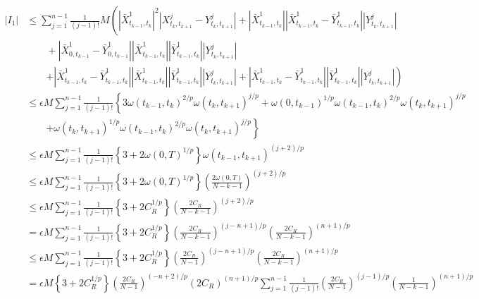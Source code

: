 \begin{prf}
\begin{description}
\begin{align}
					|I_1|
					&\leq \sum_{j=1}^{n-1} \frac{1}{(j-1)!}M \left( \left|\bar{X}^1_{t_{k-1},t_k}\right|^2\left|X^j_{t_k,t_{k+1}} - Y^j_{t_k,t_{k+1}}\right|
						+ \left|\bar{X}^1_{t_{k-1},t_k}\right| \left|\bar{X}^1_{t_{k-1},t_k}-\bar{Y}^1_{t_{k-1},t_k}\right| \left|Y^j_{t_k,t_{k+1}}\right| \right.\\
						&\qquad + \left|\bar{X}^1_{0,t_{k-1}}-\bar{Y}^1_{0,t_{k-1}}\right|\left|\bar{X}^1_{t_{k-1},t_k}\right|\left|\bar{Y}^1_{t_{k-1},t_k}\right|\left|Y^j_{t_k,t_{k+1}}\right| \\
						&\qquad \left. + \left|\bar{X}^1_{t_{k-1},t_k}-\bar{Y}^1_{t_{k-1},t_k}\right|\left|\bar{X}^1_{t_{k-1},t_k}\right|\left|\bar{Y}^1_{t_{k-1},t_k}\right|\left|Y^j_{t_k,t_{k+1}}\right|
						+ \left|\bar{X}^1_{t_{k-1},t_k}-\bar{Y}^1_{t_{k-1},t_k}\right|\left|\bar{Y}^1_{t_{k-1},t_k}\right|\left|Y^j_{t_k,t_{k+1}}\right| \right) \\
					&\leq \epsilon M \sum_{j=1}^{n-1} \frac{1}{(j-1)!} \left\{ 3 \omega(t_{k-1},t_k)^{2/p} \omega(t_k,t_{k+1})^{j/p} 
						+ \omega(0,t_{k-1})^{1/p} \omega(t_{k-1},t_k)^{2/p} \omega(t_k,t_{k+1})^{j/p} \right. \\ 
						&\qquad \left. + \omega(t_k,t_{k+1})^{1/p} \omega(t_{k-1},t_k)^{2/p} \omega(t_k,t_{k+1})^{j/p} \right\} \\
					&\leq \epsilon M \sum_{j=1}^{n-1} \frac{1}{(j-1)!} \left\{ 3 + 2 \omega(0,T)^{1/p} \right\} \omega(t_{k-1},t_{k+1})^{(j+2)/p} \\
					&\leq \epsilon M \sum_{j=1}^{n-1} \frac{1}{(j-1)!} \left\{ 3 + 2 \omega(0,T)^{1/p} \right\} \left( \frac{2\omega(0,T)}{N-k-1} \right)^{(j+2)/p} \\
					&\leq \epsilon M \sum_{j=1}^{n-1} \frac{1}{(j-1)!} \left\{ 3 + 2 C_R^{1/p} \right\} \left( \frac{2C_R}{N-k-1} \right)^{(j+2)/p} \\
					&= \epsilon M \sum_{j=1}^{n-1} \frac{1}{(j-1)!} \left\{ 3 + 2 C_R^{1/p} \right\}
						\left( \frac{2C_R}{N-k-1} \right)^{(j-n+1)/p} 
						\left( \frac{2C_R}{N-k-1} \right)^{(n+1)/p} \\
					&\leq \epsilon M \sum_{j=1}^{n-1} \frac{1}{(j-1)!} \left\{ 3 + 2 C_R^{1/p} \right\}
						\left( \frac{2C_R}{N-1} \right)^{(j-n+1)/p} 
						\left( \frac{2C_R}{N-k-1} \right)^{(n+1)/p} \\
					&= \epsilon M \left\{ 3 + 2 C_R^{1/p} \right\} \left( \frac{2C_R}{N-1} \right)^{(-n+2)/p}
						\left( 2C_R \right)^{(n+1)/p}
						\sum_{j=1}^{n-1} \frac{1}{(j-1)!} \left( \frac{2C_R}{N-1} \right)^{(j-1)/p}
						\left( \frac{1}{N-k-1} \right)^{(n+1)/p} \\

\end{align}
\end{description}
\end{prf}
